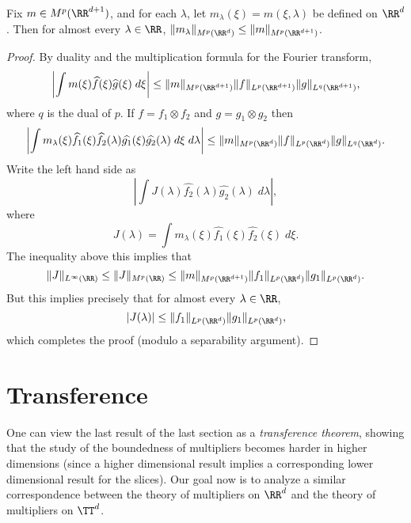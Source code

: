 \begin{theorem}
    Fix $m \in M^p(\RR^{d+1})$, and for each $\lambda$, let $m_\lambda(\xi) = m(\xi,\lambda)$ be defined on $\RR^d$. Then for almost every $\lambda \in \RR$, $\| m_\lambda \|_{M^p(\RR^d)} \leq \| m \|_{M^p(\RR^{d+1})}$.
\end{theorem}
\begin{proof}
    By duality and the multiplication formula for the Fourier transform,
    \[ \left| \int m(\xi) \widehat{f}(\xi) \widehat{g}(\xi)\; d\xi \right| \leq \| m \|_{M^p(\RR^{d+1})} \| f \|_{L^p(\RR^{d+1})} \| g \|_{L^q(\RR^{d+1})}, \]
    where $q$ is the dual of $p$. If $f = f_1 \otimes f_2$ and $g = g_1 \otimes g_2$ then
    \[ \left| \int m_\lambda(\xi) \widehat{f_1}(\xi) \widehat{f_2}(\lambda) \widehat{g_1}(\xi) \widehat{g_2}(\lambda)\; d\xi\; d\lambda \right| \leq \| m \|_{M^p(\RR^d)} \| f \|_{L^p(\RR^d)} \| g \|_{L^q(\RR^d)}. \]
    Write the left hand side as
    \[ \left| \int J(\lambda) \widehat{f_2}(\lambda) \widehat{g_2}(\lambda)\; d\lambda \right|, \]
    where
    \[ J(\lambda) = \int m_\lambda(\xi) \widehat{f_1}(\xi) \widehat{f_2}(\xi)\; d\xi. \]
    The inequality above this implies that
    \[ \| J \|_{L^\infty(\RR)} \leq \| J \|_{M^p(\RR)} \leq \| m \|_{M^p(\RR^{d+1})} \| f_1 \|_{L^p(\RR^d)} \| g_1 \|_{L^p(\RR^d)}. \]
    But this implies precisely that for almost every $\lambda \in \RR$,
    \[ |J(\lambda)| \leq \| f_1 \|_{L^p(\RR^d)} \| g_1 \|_{L^p(\RR^d)}, \]
    which completes the proof (modulo a separability argument).
\end{proof}

\section{Transference}

One can view the last result of the last section as a \emph{transference theorem}, showing that the study of the boundedness of multipliers becomes harder in higher dimensions (since a higher dimensional result implies a corresponding lower dimensional result for the slices). Our goal now is to analyze a similar correspondence between the theory of multipliers on $\RR^d$ and the theory of multipliers on $\TT^d$.

